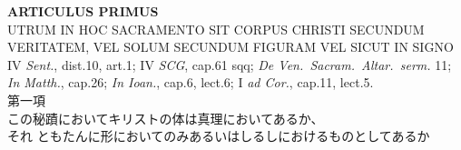 \documentclass[10pt]{jsarticle} %
\begin{document}
\newpage
{}
\begin{center}
{\Large {\bf ARTICULUS PRIMUS}}\\
{\large UTRUM IN HOC SACRAMENTO SIT CORPUS CHRISTI SECUNDUM\\
 VERITATEM, VEL SOLUM SECUNDUM FIGURAM VEL SICUT IN SIGNO}\\
{\footnotesize IV {\itshape Sent.}, dist.10, art.1; IV {\itshape
 SCG}, cap.61 sqq; {\itshape De Ven.~Sacram.~Altar.~serm.} 11;
 {\itshape In Matth.}, cap.26; {\itshape In Ioan.}, cap.6,
 lect.6; I {\itshape ad Cor.}, cap.11, lect.5.}\\
{\Large 第一項\\この秘蹟においてキリストの体は真理においてあるか、\\それ
 ともたんに形においてのみあるいはしるしにおけるものとしてあるか}
\end{center}
\end{document}
